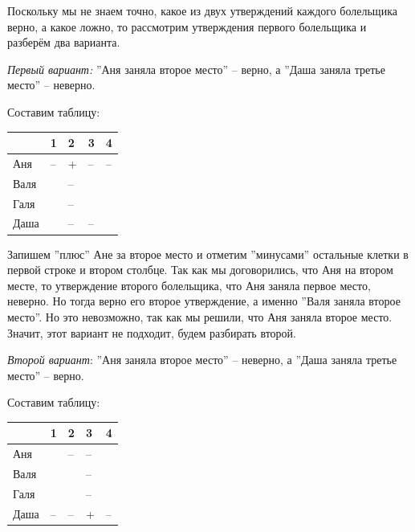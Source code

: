 \begin{prf}
    Поскольку мы не знаем точно, какое из двух утверждений каждого болельщика верно, а какое ложно, то рассмотрим утверждения первого болельщика и разберём два варианта.
    \par
    \textit{Первый вариант:} ''Аня заняла второе место'' – верно, а ''Даша заняла третье место'' – неверно. 
    \par
    Составим таблицу:
    \begin{center}
    \begin{tabular}{ | m{2cm} | m{2cm}| m{2cm} | m{2cm} | m{2cm} | } 
        \hline
        & 1 & 2 & 3 & 4 \\ 
        \hline
        Аня & -- & + & -- & --\\ 
        \hline
        Валя &  & -- &   &   \\ 
        \hline
        Галя &  & -- &   &   \\ 
        \hline
        Даша &  & -- & -- &   \\ 
        \hline
    \end{tabular}
    \end{center}
    \par
    Запишем ''плюс'' Ане за второе место и отметим ''минусами'' остальные клетки в первой строке и втором столбце. Так как мы договорились, что Аня на втором месте, то утверждение второго болельщика, что Аня заняла первое место, неверно. Но тогда верно его второе утверждение, а именно ''Валя заняла второе место''. Но это невозможно, так как мы решили, что Аня заняла второе место. Значит, этот вариант не подходит, будем разбирать второй.

    \textit{Второй вариант}: ''Аня заняла второе место'' – неверно, а ''Даша заняла третье место'' – верно.
    \par
    Составим таблицу:
    
    \begin{center}
    \begin{tabular}{ | m{2cm} | m{2cm}| m{2cm} | m{2cm} | m{2cm} | } 
        \hline
        & 1 & 2 & 3 & 4 \\ 
        \hline
        Аня &  & -- & -- & \\ 
        \hline
        Валя &  &  & -- &   \\ 
        \hline
        Галя &  &  & -- &   \\ 
        \hline
        Даша & -- & -- & + & -- \\ 
        \hline
    \end{tabular}
    \end{center}


\end{prf}
